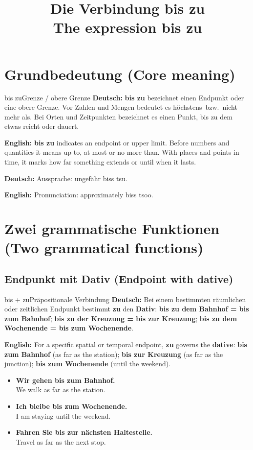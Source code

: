 \documentclass[a4paper,11pt]{article}
\title{Die Verbindung \glqq bis zu\grqq\\{\large The expression bis zu}}
\date{}
\newcommand{\GermanText}[1]{\textbf{Deutsch: }#1\par}
\newcommand{\EnglishText}[1]{{\small\color{SoftGray}\textbf{English: }#1\par}}
\newcommand{\ExampleItem}[2]{\item \textbf{#1}\\{\small\color{SoftGray}#2}}
\begin{document}
   \maketitle
   \tableofcontents
   \newpage

   \section{Grundbedeutung (Core meaning)}
      \begin{grammarentry}{bis zu}{Grenze / obere Grenze}
         \GermanText{\textbf{bis zu} bezeichnet einen Endpunkt oder eine obere Grenze. Vor Zahlen und Mengen bedeutet es \glqq höchstens\grqq\ bzw.\ \glqq nicht mehr als\grqq. Bei Orten und Zeitpunkten bezeichnet es einen Punkt, bis zu dem etwas reicht oder dauert.}
         \EnglishText{\textbf{bis zu} indicates an endpoint or upper limit. Before numbers and quantities it means up to, at most or no more than. With places and points in time, it marks how far something extends or until when it lasts.}
         \GermanText{Aussprache: ungefähr \glqq biss tsu\grqq.}
         \EnglishText{Pronunciation: approximately biss tsoo.}
      \end{grammarentry}

   \section{Zwei grammatische Funktionen (Two grammatical functions)}
      \subsection{Endpunkt mit Dativ (Endpoint with dative)}
         \begin{grammarentry}{bis + zu}{Präpositionale Verbindung}
            \GermanText{Bei einem bestimmten räumlichen oder zeitlichen Endpunkt bestimmt \textbf{zu} den \textbf{Dativ}: \textbf{bis zu dem Bahnhof = bis zum Bahnhof}; \textbf{bis zu der Kreuzung = bis zur Kreuzung}; \textbf{bis zu dem Wochenende = bis zum Wochenende}.}
            \EnglishText{For a specific spatial or temporal endpoint, \textbf{zu} governs the \textbf{dative}: \textbf{bis zum Bahnhof} (as far as the station); \textbf{bis zur Kreuzung} (as far as the junction); \textbf{bis zum Wochenende} (until the weekend).}
         \end{grammarentry}
         \begin{exbox}
            \begin{itemize}
               \ExampleItem{Wir gehen bis zum Bahnhof.}{We walk as far as the station.}
               \ExampleItem{Ich bleibe bis zum Wochenende.}{I am staying until the weekend.}
               \ExampleItem{Fahren Sie bis zur nächsten Haltestelle.}{Travel as far as the next stop.}
            \end{itemize}
         \end{exbox}
\end{document}
